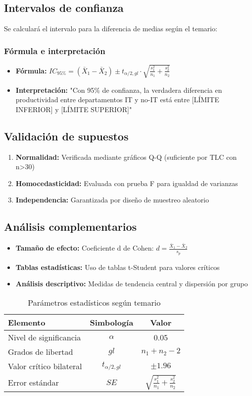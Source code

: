 	\subsection{Intervalos de confianza}
	Se calculará el intervalo para la diferencia de medias según el temario:

		\subsubsection*{Fórmula e interpretación}
		\begin{itemize}
			\item \textbf{Fórmula:} $IC_{95\%} = (\bar{X}_1 - \bar{X}_2) \pm t_{\alpha/2, gl} \cdot \sqrt{\frac{s_1^2}{n_1} + \frac{s_2^2}{n_2}}$
			\item \textbf{Interpretación:} "Con 95\% de confianza, la verdadera diferencia en productividad entre departamentos IT y no-IT está entre [LÍMITE INFERIOR] y [LÍMITE SUPERIOR]"
		\end{itemize}

	\subsection{Validación de supuestos}
	\begin{enumerate}
		\item \textbf{Normalidad:} Verificada mediante gráficos Q-Q (suficiente por TLC con n>30)
		\item \textbf{Homocedasticidad:} Evaluada con prueba F para igualdad de varianzas
		\item \textbf{Independencia:} Garantizada por diseño de muestreo aleatorio
	\end{enumerate}

	\subsection{Análisis complementarios}
	\begin{itemize}
		\item \textbf{Tamaño de efecto:} Coeficiente d de Cohen: $d = \frac{\bar{X}_1 - \bar{X}_2}{s_p}$
		\item \textbf{Tablas estadísticas:} Uso de tablas t-Student para valores críticos
		\item \textbf{Análisis descriptivo:} Medidas de tendencia central y dispersión por grupo
	\end{itemize}

	\begin{table}[H]
		\centering
		\begin{tabular}{|l|c|c|}
		\hline
		\textbf{Elemento} & \textbf{Simbología} & \textbf{Valor} \\ \hline
		Nivel de significancia & $\alpha$ & 0.05 \\ \hline
		Grados de libertad & $gl$ & $n_1 + n_2 - 2$ \\ \hline
		Valor crítico bilateral & $t_{\alpha/2, gl}$ & $\pm 1.96$ \\ \hline
		Error estándar & $SE$ & $\sqrt{\frac{s_1^2}{n_1} + \frac{s_2^2}{n_2}}$ \\ \hline
		\end{tabular}
		\caption{Parámetros estadísticos según temario}
	\end{table}